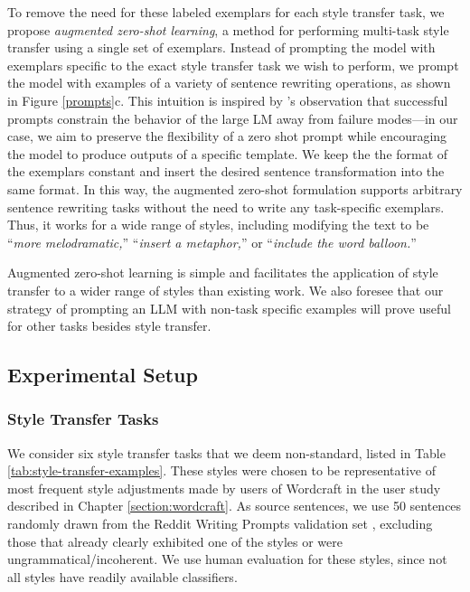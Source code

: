 To remove the need for these labeled exemplars for each style transfer task, we propose \textit{augmented zero-shot learning}, a method for performing multi-task style transfer using a single set of exemplars.
Instead of prompting the model with exemplars specific to the exact style transfer task we wish to perform, we prompt the model with examples of a variety of sentence rewriting operations, as shown in Figure \ref{prompts}c. 
This intuition is inspired by \citet{reynolds2021prompt}'s observation that successful prompts constrain the behavior of the large LM away from failure modes---in our case, we aim to preserve the flexibility of a zero shot prompt while encouraging the model to produce outputs of a specific template.
We keep the the format of the exemplars constant and insert the desired sentence transformation into the same format.
In this way, the augmented zero-shot formulation supports arbitrary sentence rewriting tasks without the need to write any task-specific exemplars.
Thus, it works for a wide range of styles, including modifying the text to be ``\textit{more melodramatic,}'' ``\textit{insert a metaphor,}'' or ``\textit{include the word balloon.}''

Augmented zero-shot learning is simple and facilitates the application of style transfer to a wider range of styles than existing work.
We also foresee that our strategy of prompting an LLM with non-task specific examples will prove useful for other tasks besides style transfer.

\subsection{Experimental Setup}


\subsubsection{Style Transfer Tasks}
We consider six style transfer tasks that we deem non-standard, listed in Table \ref{tab:style-transfer-examples}.
These styles were chosen to be representative of most frequent style adjustments made by users of Wordcraft in the user study described in Chapter \ref{section:wordcraft}.
As source sentences, we use 50 sentences randomly drawn from the Reddit Writing Prompts validation set \citep{fan2018hierarchical}, excluding those that already clearly exhibited one of the styles or were ungrammatical/incoherent.
We use human evaluation for these styles, since not all styles have readily available classifiers.

